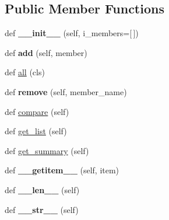 \subsection*{Public Member Functions}
\begin{DoxyCompactItemize}
\item 
def {\bfseries \+\_\+\+\_\+init\+\_\+\+\_\+} (self, i\+\_\+members=\mbox{[}$\,$\mbox{]})\hypertarget{classatod_1_1interfaces_1_1_group_a42cd06857f6d9794d9314331c48d59bc}{}\label{classatod_1_1interfaces_1_1_group_a42cd06857f6d9794d9314331c48d59bc}

\item 
def {\bfseries add} (self, member)\hypertarget{classatod_1_1interfaces_1_1_group_a837162f848dea73b4fbb97fc43462096}{}\label{classatod_1_1interfaces_1_1_group_a837162f848dea73b4fbb97fc43462096}

\item 
def \hyperlink{classatod_1_1interfaces_1_1_group_aa899721e9071f3b91d5ee54a53d9716c}{all} (cls)
\item 
def {\bfseries remove} (self, member\+\_\+name)\hypertarget{classatod_1_1interfaces_1_1_group_ac6ff24627bb35c20bdf53917db4ffccd}{}\label{classatod_1_1interfaces_1_1_group_ac6ff24627bb35c20bdf53917db4ffccd}

\item 
def \hyperlink{classatod_1_1interfaces_1_1_group_a5797ab75458b8a02fa05ba18415fc177}{compare} (self)
\item 
def \hyperlink{classatod_1_1interfaces_1_1_group_a024fa38236c8b271766bdfba3c426862}{get\+\_\+list} (self)
\item 
def \hyperlink{classatod_1_1interfaces_1_1_group_a4f8f899361148523842186e7822f6534}{get\+\_\+summary} (self)
\item 
def {\bfseries \+\_\+\+\_\+getitem\+\_\+\+\_\+} (self, item)\hypertarget{classatod_1_1interfaces_1_1_group_a79995ea461a23acd3eb633908a26aaca}{}\label{classatod_1_1interfaces_1_1_group_a79995ea461a23acd3eb633908a26aaca}

\item 
def {\bfseries \+\_\+\+\_\+len\+\_\+\+\_\+} (self)\hypertarget{classatod_1_1interfaces_1_1_group_adf5a671a4381821232ff047ed8ae19f3}{}\label{classatod_1_1interfaces_1_1_group_adf5a671a4381821232ff047ed8ae19f3}

\item 
def {\bfseries \+\_\+\+\_\+str\+\_\+\+\_\+} (self)\hypertarget{classatod_1_1interfaces_1_1_group_a85b3c25f20a5d8d355ee214ec90e911c}{}\label{classatod_1_1interfaces_1_1_group_a85b3c25f20a5d8d355ee214ec90e911c}

\end{DoxyCompactItemize}
